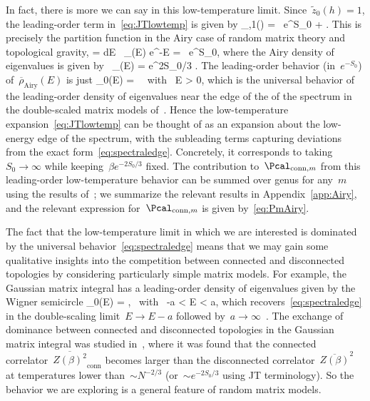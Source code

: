 \documentclass[12pt]{article}
\begin{document}
In fact, there is more we can say in this low-temperature limit.  Since~$\tilde{z}_0(h) = 1$, the leading-order term in~\eqref{eq:JTlowtemp} is given by
\be
\Pcal_{,1}(\beta) =  \, e^{S_0} + \cdots.
\ee
This is precisely the partition function in the Airy case of random matrix theory and topological gravity,
\be
{} = \int dE \, \overline{\rho}_(E) e^{-\beta E} =  \, e^{S_0},
\ee
where the Airy density of eigenvalues is given by~\cite{Wit90,Kon92}
\be
\overline{\rho}_(E) = e^{2S_0/3} .
\ee
The leading-order behavior (in~$e^{-S_0}$) of~$\overline{\rho}_\mathrm{Airy}(E)$ is just
\be
\label{eq:spectraledge}
\rho_0(E) =  \,  \mbox{ with } E > 0,
\ee
which is the universal behavior of the leading-order density of eigenvalues near the edge of the of the spectrum in the double-scaled matrix models of~\cite{SSS}.  Hence the low-temperature expansion~\eqref{eq:JTlowtemp} can be thought of as an expansion about the low-energy edge of the spectrum, with the subleading terms capturing deviations from the exact form~\eqref{eq:spectraledge}.  Concretely, it corresponds to taking~$S_0 \to \infty$ while keeping~$\beta e^{-2S_0/3}$ fixed.  The contribution to~$\Pcal_{\mathrm{conn},m}$ from this leading-order low-temperature behavior can be summed over genus for any~$m$ using the results of~\cite{Oko01}; we summarize the relevant results in Appendix~\ref{app:Airy}, and the relevant expression for~$\Pcal_{\mathrm{conn},m}$ is given by~\eqref{eq:PmAiry}.

The fact that the low-temperature limit in which we are interested is dominated by the universal behavior~\eqref{eq:spectraledge} means that we may gain some qualitative insights into the competition between connected and disconnected topologies by considering particularly simple matrix models.  For example, the Gaussian matrix integral has a leading-order density of eigenvalues given by the Wigner semicircle
\be
\rho_0(E) =  , \mbox{ with } -a < E < a,
\ee
which recovers~\eqref{eq:spectraledge} in the double-scaling limit~$E \to E - a$ followed by~$a \to \infty$~\cite{GinMoo93}.  The exchange of dominance between connected and disconnected topologies in the Gaussian matrix integral was studied in~\cite{Oku19}, where it was found that the connected correlator~$\overline{Z(\beta)^2}_\mathrm{conn}$ becomes larger than the disconnected correlator~$\overline{Z(\beta)}^2$ at temperatures lower than~$\sim N^{-2/3}$ (or~$\sim e^{-2S_0/3}$ using JT terminology).  So the behavior we are exploring is a general feature of random matrix models.
\end{document}
